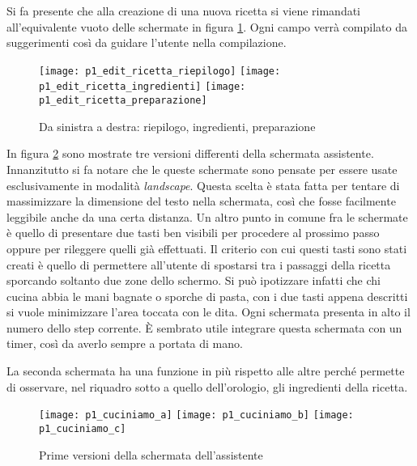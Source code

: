 Si fa presente che alla creazione di una nuova ricetta si viene rimandati all'equivalente vuoto delle schermate in figura \ref{fig:p1_edit_ricetta}.
Ogni campo verrà compilato da suggerimenti così da guidare l'utente nella compilazione.

\begin{figure}[ht]
  \begin{center}
    \texttt{[image: p1\_edit\_ricetta\_riepilogo]}
    \texttt{[image: p1\_edit\_ricetta\_ingredienti]}
    \texttt{[image: p1\_edit\_ricetta\_preparazione]}
    \caption{Da sinistra a destra: riepilogo, ingredienti, preparazione}
    \label{fig:p1_edit_ricetta}
  \end{center}
\end{figure}


In figura \ref{fig:p1_cuciniamo} sono mostrate tre versioni differenti della schermata assistente.
Innanzitutto si fa notare che le queste schermate sono pensate per essere usate esclusivamente in modalità \textit{landscape}.
Questa scelta è stata fatta per tentare di massimizzare la dimensione del testo nella schermata, così che fosse facilmente leggibile anche da una certa distanza.
Un altro punto in comune fra le schermate è quello di presentare due tasti ben visibili per procedere al prossimo passo oppure per rileggere quelli già effettuati.
Il criterio con cui questi tasti sono stati creati è quello di permettere all'utente di spostarsi tra i passaggi della ricetta sporcando soltanto due zone dello schermo.
Si può ipotizzare infatti che chi cucina abbia le mani bagnate o sporche di pasta, con i due tasti appena descritti si vuole minimizzare l'area toccata con le dita.
Ogni schermata presenta in alto il numero dello step corrente.
È sembrato utile integrare questa schermata con un timer, così da averlo sempre a portata di mano.

La seconda schermata ha una funzione in più rispetto alle altre perché permette di osservare, nel riquadro sotto a quello dell'orologio, gli ingredienti della ricetta.

\clearpage
\begin{figure}[ht]
  \begin{center}
    \texttt{[image: p1\_cuciniamo\_a]}
    \texttt{[image: p1\_cuciniamo\_b]}
    \texttt{[image: p1\_cuciniamo\_c]}
    \caption{Prime versioni della schermata dell'assistente}
    \label{fig:p1_cuciniamo}
  \end{center}
\end{figure}


